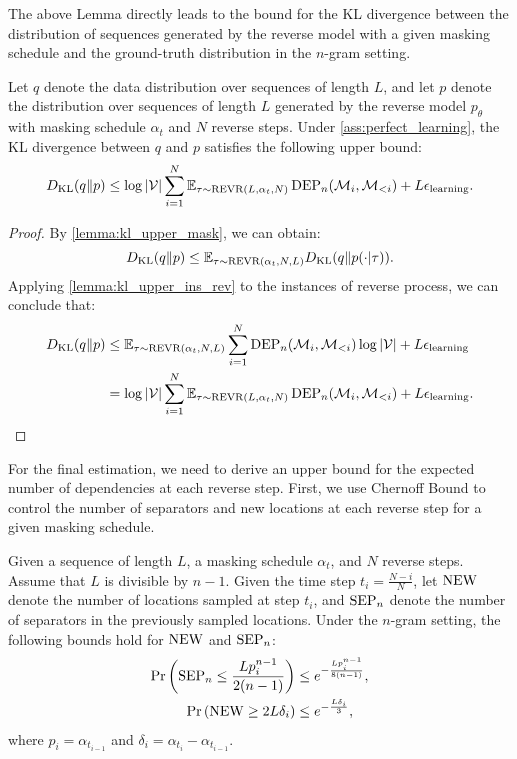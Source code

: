 The above Lemma directly leads to the bound for the KL divergence between the distribution of sequences generated by the reverse model with a given masking schedule and the ground-truth distribution in the $n$-gram setting.

\begin{lemma}
\label{lemma:kl_bound_mask}
    Let $q$ denote the data distribution over sequences of length $L$, and let $p$ denote the distribution over sequences of length $L$ generated by the reverse model $p_\theta$ with masking schedule $\alpha_t$ and $N$ reverse steps. Under \cref{ass:perfect_learning}, the KL divergence between $q$ and $p$ satisfies the following upper bound:
    \[
    D_{\mathrm{KL}}(q\|p) \leq \log |{\mathcal{V}}| \sum_{i=1}^N \mathbb{E}_{\tau\sim\operatorname{REVR}(L, \alpha_t, N)} \operatorname{DEP}_n({\mathcal{M}}_i, {\mathcal{M}}_{<i})+L{\epsilon}_\mathrm{learning}.
    \]
\end{lemma}

\begin{proof}
    By \cref{lemma:kl_upper_mask}, we can obtain:
    $$D_{\mathrm{KL}}(q\|p) \leq \mathbb{E}_{\tau \sim \operatorname{REVR}(\alpha_t, N, L)} D_{\mathrm{KL}}(q\|p(\cdot | \tau)).$$
    Applying \cref{lemma:kl_upper_ins_rev} to the instances of reverse process, we can conclude that:
    \begin{align*}
    D_{\mathrm{KL}}(q\|p) &\leq \mathbb{E}_{\tau \sim \operatorname{REVR}(\alpha_t, N,L)}\sum_{i=1}^N\operatorname{DEP}_n({\mathcal{M}}_i,{\mathcal{M}}_{<i})\log|{\mathcal{V}}|+L{\epsilon}_\mathrm{learning}\\
    &=\log |{\mathcal{V}}| \sum_{i=1}^N \mathbb{E}_{\tau\sim\operatorname{REVR}(L, \alpha_t, N)} \operatorname{DEP}_n({\mathcal{M}}_i, {\mathcal{M}}_{<i})+L{\epsilon}_\mathrm{learning}.
    \end{align*}
\end{proof}

For the final estimation, we need to derive an upper bound for the expected number of dependencies at each reverse step. First, we use Chernoff Bound to control the number of separators and new locations at each reverse step for a given masking schedule.

\begin{lemma}
\label{lemma:bound_sep_new_rev}
    Given a sequence of length $L$, a masking schedule $\alpha_t$, and $N$ reverse steps. Assume that $L$ is divisible by $n-1$. Given the time step $t_i = \frac{N-i}{N}$, let $\operatorname{NEW}$ denote the number of locations sampled at step $t_i$, and $\operatorname{SEP}_n$ denote the number of separators in the previously sampled locations. Under the $n$-gram setting, the following bounds hold for $\operatorname{NEW}$ and $\operatorname{SEP}_n$:
    \begin{align*}
        \Pr\left(\operatorname{SEP}_n\leq \frac{Lp_i^{n-1}}{2(n-1)}\right)&\leq e^{-\frac{Lp_i^{n-1}}{8(n-1)}},\\
        \Pr\left(\operatorname{NEW}\geq 2L\delta_i\right)&\leq e^{-\frac{L\delta_i}{3}},
    \end{align*}
    where $p_i = \alpha_{t_{i-1}}$ and $\delta_i = \alpha_{t_i} - \alpha_{t_{i-1}}$.
\end{lemma}

